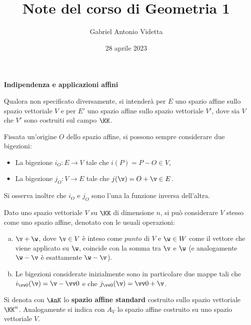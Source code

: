 \documentclass[11pt]{article}
\title{\textbf{Note del corso di Geometria 1}}
\author{Gabriel Antonio Videtta}
\date{28 aprile 2023}
\begin{document}
	
	\maketitle
	
	\begin{center}
		\Large \textbf{Indipendenza e applicazioni affini}
	\end{center}
	
	\begin{note} Qualora non specificato diversamente, si intenderà per
		$E$ uno spazio affine sullo spazio vettoriale $V$ e
		per $E'$ uno spazio affine sullo spazio vettoriale $V'$, dove sia $V$ che $V'$ sono costruiti
		sul campo $\KK$.
	\end{note}
	
	Fissata un'origine $O$ dello spazio affine, si possono sempre considerare due
	bigezioni:
	
	\begin{itemize}
		\item La bigezione $i_O : E \to V$ tale che $i(P) = P - O \in V$,
		\item La bigezione $j_O : V \to E$ tale che $j(\v) = O + \v \in E$.
	\end{itemize}
	
	Si osserva inoltre che $i_O$ e $j_O$ sono l'una la funzione inversa dell'altra.
	
	Dato uno spazio vettoriale $V$ su $\KK$ di dimensione $n$, si può considerare $V$ stesso
	come uno spazio affine, denotato  con le usuali operazioni:
	
	\begin{enumerate}[(a)]
		\item $\v + \w$, dove $\v \in V$ è inteso come $\mathit{punto}$ di $V$ e $\w \in W$ come
		il vettore che viene applicato su $\w$, coincide con la somma tra $\v$ e $\w$ (e analogamente
		$\w - \v$ è esattamente $\w - \v$).
		
		\item Le bigezioni considerate inizialmente sono in particolare due mappe tali che
		$i_{\vv 0}(\v) = \v - \vv 0$ e che $j_{\vv 0}(\v) = \vv 0 + \v$.
	\end{enumerate}
	
	\begin{definition} 
		Si denota con $\AnK$ lo \textbf{spazio affine standard} costruito sullo spazio vettoriale
		$\KK^n$. Analogamente si indica con $A_V$ lo spazio affine costruito su uno spazio
		vettoriale $V$.
	\end{definition}
\end{document}
